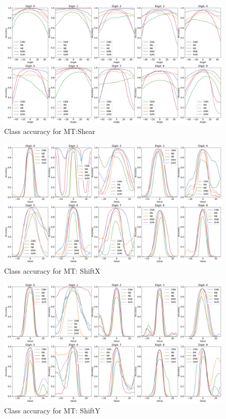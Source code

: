     \begin{figure}[H]
    \centering
        \includegraphics[width=\textwidth]{chapters/results/MT/ShearAll.png}
        \caption{Class accuracy for MT:Shear}
        \label{fig:Digit by misclassification for Shear MR}
    \end{figure}
    
    \begin{figure}[ht!]
    \centering
        \includegraphics[width=\textwidth]{chapters/results/MT/ShiftXAll.png}
        \caption{Class accuracy for MT: ShiftX}
        \label{fig:Rotate-misclass0}
    \end{figure}
    
    \begin{figure}[H]
    \centering
        \includegraphics[width=\textwidth]{chapters/results/MT/ShiftYAll.png}
        \caption{Class accuracy for MT: ShiftY}
        \label{fig:Rotate-misclass0}
    \end{figure}
    

